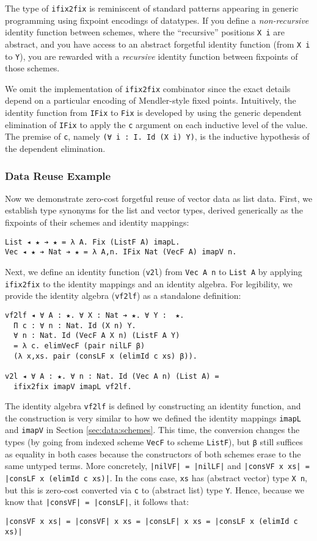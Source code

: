 \documentclass[acmsmall]{acmart}\settopmatter{}
\newcommand{\refsec}[1]{Section \ref{sec:#1}}
\begin{document}
The type of \verb;ifix2fix; is reminiscent of standard patterns
appearing in generic programming using fixpoint encodings of
datatypes. If you define a \textit{non-recursive}
identity function between schemes, where the
``recursive'' positions \verb;X i; are abstract, and you have access to an
abstract forgetful identity function (from \verb;X i; to \verb;Y;),
you are rewarded with a \textit{recursive}
identity function between fixpoints of those schemes.

We omit the implementation of \verb;ifix2fix; combinator since the
exact details depend on a particular encoding of Mendler-style fixed
points. Intuitively, the identity function from \verb;IFix; to
\verb;Fix; is developed by using the generic dependent elimination of
\verb;IFix; to apply the \verb;c; argument on each inductive level of
the value. The premise of \verb;c;, namely
\verb;(∀ i : I. Id (X i) Y);, is the inductive hypothesis of the
dependent elimination.

\subsubsection{Data Reuse Example}

Now we demonstrate zero-cost forgetful reuse of vector data as list
data. First, we establish type synonyms for the list and vector types,
derived generically as the fixpoints of their schemes and identity
mappings:
\begin{verbatim}
List ◂ ★ ➔ ★ = λ A. Fix (ListF A) imapL.
Vec ◂ ★ ➔ Nat ➔ ★ = λ A,n. IFix Nat (VecF A) imapV n.
\end{verbatim}
Next, we define an identity function (\verb;v2l;) from
\verb;Vec A n; to \verb;List A; by applying
\verb;ifix2fix; to the identity mappings and an
identity algebra. For legibility, we provide the identity algebra
(\verb;vf2lf;) as a standalone definition:
\begin{verbatim}
vf2lf ◂ ∀ A : ★. ∀ X : Nat ➔ ★. ∀ Y :  ★. 
  Π c : ∀ n : Nat. Id (X n) Y.
  ∀ n : Nat. Id (VecF A X n) (ListF A Y)
  = λ c. elimVecF (pair nilLF β)
  (λ x,xs. pair (consLF x (elimId c xs) β)).

v2l ◂ ∀ A : ★. ∀ n : Nat. Id (Vec A n) (List A) =
  ifix2fix imapV imapL vf2lf. 
\end{verbatim}
The identity algebra \verb;vf2lf; is defined by constructing an
identity function, and the construction is very similar to how we
defined the identity mappings \verb;imapL; and \verb;imapV; in
\refsec{data:schemes}. This time, the conversion changes the types (by going
from indexed scheme \verb;VecF; to scheme \verb;ListF;), but \verb;β;
still suffices as equality in both cases because the constructors of
both schemes erase to the same untyped terms. More concretely,
\verb;|nilVF| = |nilLF|; and
\verb;|consVF x xs| = |consLF x (elimId c xs)|;. In the cons case,
\verb;xs; has (abstract vector) type \verb;X n;, but this is zero-cost
converted via \verb;c; to (abstract list) type \verb;Y;. Hence,
because we know that \verb;|consVF| = |consLF|;, it follows that:
\begin{verbatim}
|consVF x xs| = |consVF| x xs = |consLF| x xs = |consLF x (elimId c xs)|
\end{verbatim}
\end{document}
